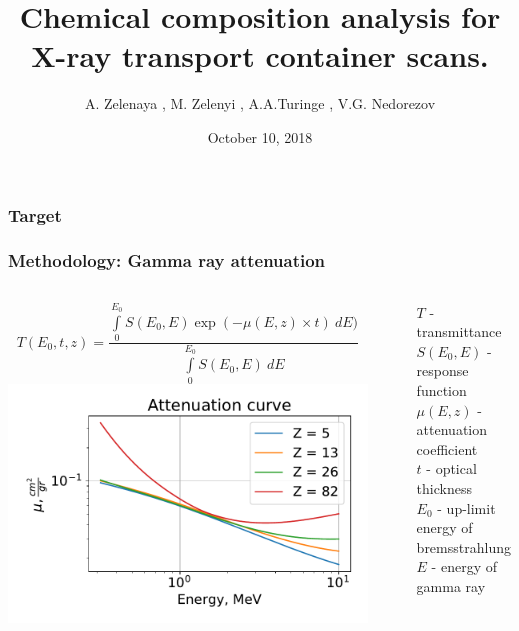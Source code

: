 \documentclass[11pt]{beamer}
\begin{document}
    \author{A. Zelenaya , M. Zelenyi , A.A.Turinge ,  V.G. Nedorezov }
    \title{Chemical composition analysis for X-ray transport container scans. }
    \date{October 10, 2018}
    \frame[plain]{\maketitle}
    
    \begin{frame}
        \frametitle{Target}
    \end{frame}
    \begin{frame}
    \frametitle{Methodology: Gamma ray attenuation}
    \begin{columns}
        \begin{column}{0.8\textwidth}
            $$
            T(E_0, t, z) = \frac{\int \limits_0^{E_0} S(E_0, E) \exp(-\mu(E,z)\times t)~dE)}{\int \limits_0^{E_0} S(E_0, E)~dE}
            $$
               \includegraphics[width=1\textwidth]{figures/Attenuation.pdf}
        \end{column}
    \vline~
        \begin{column}{0.4\textwidth} 
            $T$ -  transmittance\\
            $S(E_0, E)$ - response function\\
            $\mu(E,z)$ - attenuation coefficient\\
            $t$ -  optical thickness\\
            $E_0$ -  up-limit energy of bremsstrahlung\\
            $E$ - energy of gamma ray\\
        \end{column}
    \end{columns}  
\end{frame}
\end{document}
